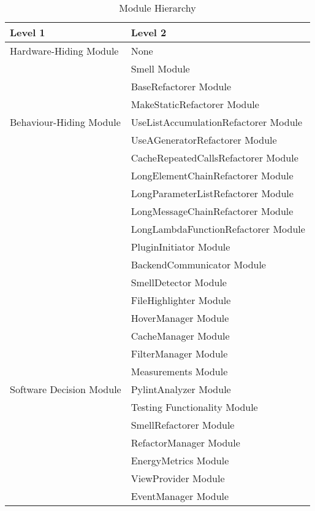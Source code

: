 \documentclass[12pt, titlepage]{article}
\begin{document}
\begin{table}[h!]
  \centering
  \begin{tabular}{p{} p{}}
  \toprule
  \textbf{Level 1} & \textbf{Level 2}\\
  \midrule
  
  {Hardware-Hiding Module} & None \\
  \midrule
  
  \multirow{7}{0.3\textwidth}{Behaviour-Hiding Module} & Smell Module\\
  & BaseRefactorer Module\\
  & MakeStaticRefactorer Module\\
  & UseListAccumulationRefactorer Module\\
  & UseAGeneratorRefactorer Module\\
  & CacheRepeatedCallsRefactorer Module\\
  & LongElementChainRefactorer Module\\
  & LongParameterListRefactorer Module\\
  & LongMessageChainRefactorer Module\\
  & LongLambdaFunctionRefactorer Module\\ 
  & PluginInitiator Module\\
  & BackendCommunicator Module\\ 
  & SmellDetector Module\\
  & FileHighlighter Module\\
  & HoverManager Module\\
  & CacheManager Module\\
  & FilterManager Module\\
  \midrule


  \multirow{3}{0.3\textwidth}{Software Decision Module} & Measurements Module\\
& PylintAnalyzer Module\\
    & Testing Functionality Module\\
& SmellRefactorer Module\\
& RefactorManager Module\\
& EnergyMetrics Module\\
& ViewProvider Module\\
& EventManager Module\\
\bottomrule
\end{tabular}
\caption{Module Hierarchy}
\label{TblMH}
\end{table}

~\newpage
\end{document}
